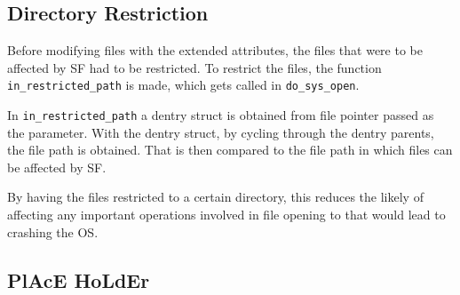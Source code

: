 \subsection*{Directory Restriction}
Before modifying files with the extended attributes, the files that were to be affected by SF had to be restricted. To restrict the files, the function \texttt{in\_restricted\_path} is made, which gets called in \texttt{do\_sys\_open}. 

In \texttt{in\_restricted\_path} a dentry struct is obtained from file pointer passed as the parameter. With the dentry struct, by cycling through the dentry parents, the file path is obtained. That is then compared to the file path in which files can be affected by SF.

By having the files restricted to a certain directory, this reduces the likely of affecting any important operations involved in file opening to that would lead to crashing the OS. 

\subsection*{PlAcE HoLdEr}

